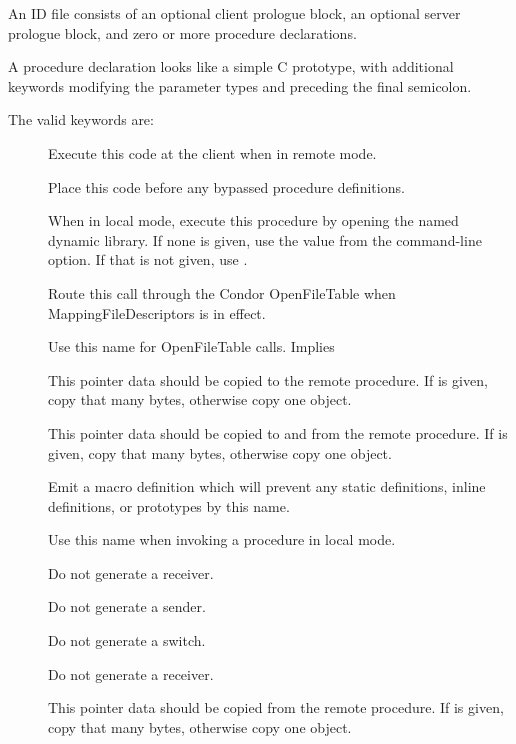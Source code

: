 An ID file consists of an optional client prologue block, an optional server prologue block, and zero or more procedure declarations.

A procedure declaration looks like a simple C prototype, with additional keywords modifying the parameter types and preceding the final semicolon.

The valid keywords are:
\begin{description}
\item[] Execute this code at the client when in remote mode.
\item[] Place this code before any bypassed procedure definitions.
\item[] When in local mode, execute this procedure by opening the named dynamic library.  If none is given, use the value from the  command-line option.  If that is not given, use .
\item[] Route this call through the Condor OpenFileTable when MappingFileDescriptors is in effect.
\item[] Use this name for OpenFileTable calls.  Implies 
\item[] This pointer data should be copied to the remote procedure.  If  is given, copy that many bytes, otherwise copy one object.
\item[] This pointer data should be copied to and from the remote procedure.  If  is given, copy that many bytes, otherwise copy one object.
\item[] Emit a macro definition which will prevent any static definitions, inline definitions, or prototypes by this name.
\item[] Use this name when invoking a procedure in local mode.
\item[] Do not generate a receiver.
\item[] Do not generate a sender.
\item[] Do not generate a switch.
\item[] Do not generate a receiver.
\item[] This pointer data should be copied from the remote procedure.  If  is given, copy that many bytes, otherwise copy one object.

\end{description}
